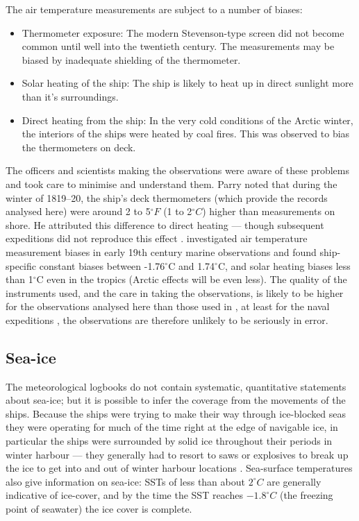 \documentclass[CP]{copernicus}
\begin{document}
The air temperature measurements are subject to a number of biases:
\begin{itemize}
\item Thermometer exposure: The modern Stevenson-type screen did not become common until well into the twentieth century. The measurements may be biased by inadequate shielding of the thermometer.
\item Solar heating of the ship: The ship is likely to heat up in direct sunlight more than it's surroundings.
\item Direct heating from the ship: In the very cold conditions of the Arctic winter, the interiors of the ships were heated by coal fires. This was observed to bias the thermometers on deck. 
\end{itemize}
The officers and scientists making the observations were aware of these problems and took care to minimise and understand them. Parry noted that during the winter of 1819--20, the ship's deck thermometers (which provide the records analysed here) were around 2 to 5$^\circ F$ (1 to 2$^\circ C$) higher than measurements on shore. He attributed this difference to direct heating --- though subsequent expeditions did not reproduce this effect \citep{ward06instruments}. \citet{chenoweth00homogenization} investigated air temperature measurement biases in early 19th century marine observations and found ship-specific constant biases between -1.76$^\circ$C and 1.74$^\circ$C, and solar heating biases less than 1$^\circ$C even in the tropics (Arctic effects will be even less). The quality of the instruments used, and the care in taking the observations, is likely to be higher for the observations analysed here than those used in \citet{chenoweth00homogenization}, at least for the naval expeditions \citep{ward06instruments}, the observations are therefore unlikely to be seriously in error.

\subsection{Sea-ice}

The meteorological logbooks do not contain systematic, quantitative statements about sea-ice; but it is possible to infer the coverage from the movements of the ships. Because the ships were trying to make their way through ice-blocked seas they were operating for much of the time right at the edge of navigable ice, in particular the ships were surrounded by solid ice throughout their periods in winter harbour --- they generally had to resort to saws or explosives to break up the ice to get into and out of winter harbour locations \citep{parry_1819,parry_1821,parry_1824}. Sea-surface temperatures also give information on sea-ice: SSTs of less than about $2^\circ C$ are generally indicative of ice-cover, and by the time the SST reaches $-1.8^\circ C$ (the freezing point of seawater) the ice cover is complete.
\end{document}
